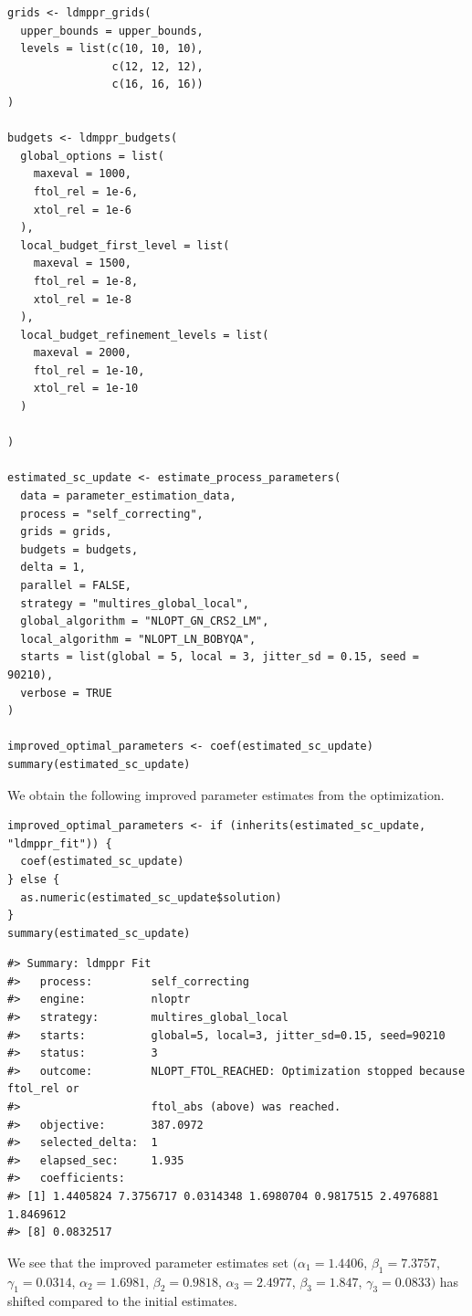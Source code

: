 \begin{verbatim}
grids <- ldmppr_grids(
  upper_bounds = upper_bounds,
  levels = list(c(10, 10, 10),
                c(12, 12, 12),
                c(16, 16, 16))
)

budgets <- ldmppr_budgets(
  global_options = list(
    maxeval = 1000,
    ftol_rel = 1e-6,
    xtol_rel = 1e-6
  ),
  local_budget_first_level = list(
    maxeval = 1500,
    ftol_rel = 1e-8,
    xtol_rel = 1e-8
  ),
  local_budget_refinement_levels = list(
    maxeval = 2000,
    ftol_rel = 1e-10,
    xtol_rel = 1e-10
  )
  
)

estimated_sc_update <- estimate_process_parameters(
  data = parameter_estimation_data,
  process = "self_correcting",
  grids = grids,
  budgets = budgets,
  delta = 1,
  parallel = FALSE,
  strategy = "multires_global_local",
  global_algorithm = "NLOPT_GN_CRS2_LM",
  local_algorithm = "NLOPT_LN_BOBYQA",
  starts = list(global = 5, local = 3, jitter_sd = 0.15, seed = 90210),
  verbose = TRUE
)

improved_optimal_parameters <- coef(estimated_sc_update)
summary(estimated_sc_update)
\end{verbatim}

We obtain the following improved parameter estimates from the
optimization.

\begin{verbatim}
improved_optimal_parameters <- if (inherits(estimated_sc_update, "ldmppr_fit")) {
  coef(estimated_sc_update)
} else {
  as.numeric(estimated_sc_update$solution)
}
summary(estimated_sc_update)
\end{verbatim}

\begin{verbatim}
#> Summary: ldmppr Fit
#>   process:         self_correcting
#>   engine:          nloptr
#>   strategy:        multires_global_local
#>   starts:          global=5, local=3, jitter_sd=0.15, seed=90210
#>   status:          3
#>   outcome:         NLOPT_FTOL_REACHED: Optimization stopped because ftol_rel or
#>                    ftol_abs (above) was reached.
#>   objective:       387.0972
#>   selected_delta:  1
#>   elapsed_sec:     1.935
#>   coefficients:
#> [1] 1.4405824 7.3756717 0.0314348 1.6980704 0.9817515 2.4976881 1.8469612
#> [8] 0.0832517
\end{verbatim}

We see that the improved parameter estimates set
\((\alpha_1 = 1.4406\),
\(\beta_1 = 7.3757\),
\(\gamma_1 = 0.0314\),
\(\alpha_2 = 1.6981\),
\(\beta_2 = 0.9818\),
\(\alpha_3 = 2.4977\),
\(\beta_3 = 1.847\),
\(\gamma_3 = 0.0833)\) has shifted
compared to the initial estimates.

